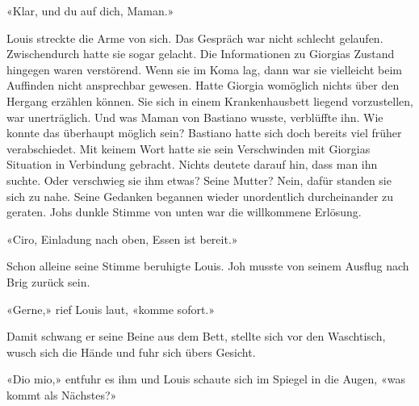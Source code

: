 «Klar, und du auf dich, Maman.»


\sectionbreak

Louis streckte die Arme von sich. Das Gespräch war nicht schlecht gelaufen. Zwischendurch hatte sie sogar gelacht.
Die Informationen zu Giorgias Zustand hingegen waren verstörend. Wenn
sie im Koma lag, dann war sie vielleicht beim Auffinden nicht
ansprechbar gewesen. Hatte Giorgia womöglich nichts über den Hergang
erzählen können. Sie sich in einem Krankenhausbett liegend vorzustellen, war unerträglich. 
Und was Maman von Bastiano wusste, verblüffte ihn. Wie konnte das überhaupt möglich sein? Bastiano
hatte sich doch bereits viel früher verabschiedet.
Mit keinem Wort hatte sie sein Verschwinden mit Giorgias Situation
in Verbindung gebracht. Nichts deutete darauf hin, dass man ihn suchte.
Oder verschwieg sie ihm etwas? Seine Mutter? Nein, dafür standen sie
sich zu nahe. Seine Gedanken begannen wieder unordentlich durcheinander
zu geraten.
Johs dunkle Stimme von unten war die willkommene Erlösung.

«Ciro, Einladung nach oben, Essen ist bereit.»

Schon alleine seine Stimme beruhigte Louis. Joh musste von seinem
Ausflug nach Brig zurück sein.

«Gerne,» rief Louis laut, «komme sofort.»

Damit schwang er seine Beine aus dem Bett, stellte sich vor den
Waschtisch, wusch sich die Hände und fuhr sich übers Gesicht.

«Dio mio,» entfuhr es ihm und Louis schaute sich im Spiegel in die Augen,
«was kommt als Nächstes?»

